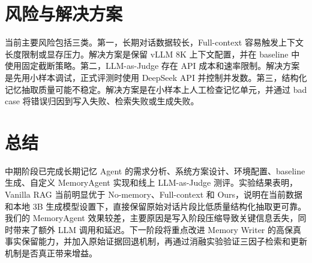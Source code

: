 \documentclass[UTF8,a4paper,11pt]{ctexart}
\begin{document}
\section{风险与解决方案}

当前主要风险包括三类。第一，长期对话数据较长，Full-context 容易触发上下文长度限制或显存压力。解决方案是保留 vLLM 8K 上下文配置，并在 baseline 中使用固定截断策略。第二，LLM-as-Judge 存在 API 成本和速率限制。解决方案是先用小样本调试，正式评测时使用 DeepSeek API 并控制并发数。第三，结构化记忆抽取质量可能不稳定。解决方案是在小样本上人工检查记忆单元，并通过 bad case 将错误归因到写入失败、检索失败或生成失败。

\section{总结}

中期阶段已完成长期记忆 Agent 的需求分析、系统方案设计、环境配置、baseline 生成、自定义 MemoryAgent 实现和线上 LLM-as-Judge 测评。实验结果表明，Vanilla RAG 当前明显优于 No-memory、Full-context 和 Ours，说明在当前数据和本地 3B 生成模型设置下，直接保留原始对话片段比低质量结构化抽取更可靠。我们的 MemoryAgent 效果较差，主要原因是写入阶段压缩导致关键信息丢失，同时带来了额外 LLM 调用和延迟。下一阶段将重点改进 Memory Writer 的高保真事实保留能力，并加入原始证据回退机制，再通过消融实验验证三因子检索和更新机制是否真正带来增益。
\end{document}
